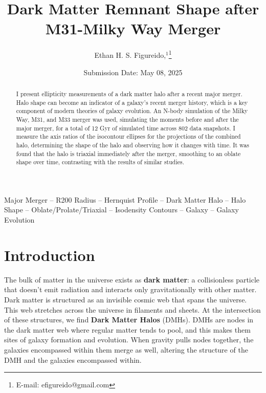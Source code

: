 \documentclass[fleqn,usenatbib]{mnras}
\title[Dark Matter Remnant Shape]{Dark Matter Remnant Shape after M31-Milky Way Merger}
\author[E. H. S. Figureido]{
Ethan H. S. Figureido,$^{1}$\thanks{E-mail: efigureido@gmail.com}}
\date{Submission Date: May 08, 2025}
\begin{document}
\label{firstpage}
\pagerange{\pageref{firstpage}--\pageref{lastpage}}
\maketitle

\begin{abstract}
    I present ellipticity measurements of a dark matter halo after a recent major merger. Halo shape can become an indicator of a galaxy's recent merger history, which is a key component of modern theories of galaxy evolution. An N-body simulation of the Milky Way, M31, and M33 merger was used, simulating the moments before and after the major merger, for a total of 12 Gyr of simulated time across 802 data snapshots. I measure the axis ratios of the isocontour ellipses for the projections of the combined halo, determining the shape of the halo and observing how it changes with time. It was found that the halo is triaxial immediately after the merger, smoothing to an oblate shape over time, contrasting with the results of similar studies.
    
\end{abstract}


\begin{keywords}
Major Merger -- R200 Radius -- Hernquist Profile -- Dark Matter Halo -- Halo Shape -- Oblate/Prolate/Triaxial -- Isodensity Contours -- Galaxy -- Galaxy Evolution 
\end{keywords}



\section{Introduction}

The bulk of matter in the universe exists as \textbf{dark matter}: a collisionless particle that doesn’t emit radiation and interacts only gravitationally with other matter. Dark matter is structured as an invisible cosmic web that spans the universe. This web stretches across the universe in filaments and sheets. At the intersection of these structures, we find \textbf{Dark Matter Halos} (DMHs). DMHs are nodes in the dark matter web where regular matter tends to pool, and this makes them sites of galaxy formation and evolution. When gravity pulls nodes together, the galaxies encompassed within them merge as well, altering the structure of the DMH and the galaxies encompassed within.
\end{document}
